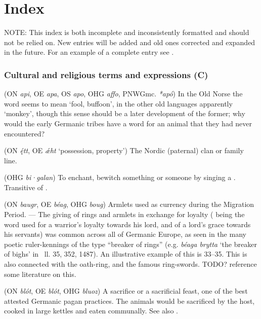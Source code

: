 \part{Index}


NOTE: This index is both incomplete and inconsistently formatted and should not be relied on.  New entries will be added and old ones corrected and expanded in the future.  For an example of a complete entry see .


\section{Cultural and religious terms and expressions (C)}
\begin{itemize}

 (ON \emph{api}, OE \emph{apa}, OS \emph{apo}, OHG \emph{affo}, PNWGmc. \emph{*apó})
  In the Old Norse the word seems to mean ‘fool, buffoon’, in the other old languages apparently ‘monkey’, though this sense should be a later development of the former; why would the early Germanic tribes have a word for an animal that they had never encountered?

 (ON \emph{ę́tt}, OE \emph{ǽht} ‘possession, property’)
  The Nordic (paternal) clan or family line.

 (OHG \emph{bi·galan})
  To enchant, bewitch something or someone by singing a . Transitive of .

 (ON \emph{baugr}, OE \emph{béag}, OHG \emph{boug})
  Armlets used as currency during the Migration Period. --- The giving of rings and armlets in exchange for loyalty ( being the word used for a warrior’s loyalty towards his lord, and of a lord’s grace towards his servants) was common across all of Germanic Europe, as seen in the many poetic ruler-kennings of the type “breaker of rings” (e.g. \emph{béaga brytta} ‘the breaker of bighs’ in \Beowulf\ ll. 35, 352, 1487). An illustrative example of this is  33--35.
  This is also connected with the oath-ring, and the famous ring-swords. TODO? reference some literature on this.

 (ON \emph{blót}, OE \emph{blót}, OHG \emph{bluoz})
  A sacrifice or a sacrificial feast, one of the best attested Germanic pagan practices. The animals would be sacrificed by the host, cooked in large kettles and eaten communally. See also .


\end{itemize}
